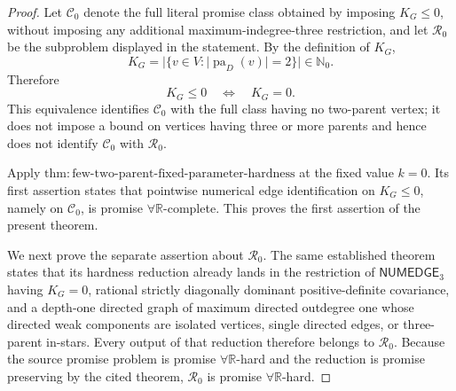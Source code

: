 \documentclass{article}
\begin{document}
\begin{proof}
Let \(\mathcal C_0\) denote the full literal promise class obtained by imposing \(K_G\leq 0\), without imposing any additional maximum-indegree-three restriction, and let \(\mathcal R_0\) be the subproblem displayed in the statement.  By the definition of \(K_G\),
\[
K_G=\bigl\lvert\{v\in V:\lvert\operatorname{pa}_D(v)\rvert=2\}\bigr\rvert\in\mathbb N_0.
\]
Therefore
\[
K_G\leq 0\quad\Longleftrightarrow\quad K_G=0.
\]
This equivalence identifies \(\mathcal C_0\) with the full class having no two-parent vertex; it does not impose a bound on vertices having three or more parents and hence does not identify \(\mathcal C_0\) with \(\mathcal R_0\).

Apply \(\mathrm{thm:few\mbox{-}two\mbox{-}parent\mbox{-}fixed\mbox{-}parameter\mbox{-}hardness}\) at the fixed value \(k=0\).  Its first assertion states that pointwise numerical edge identification on \(K_G\leq 0\), namely on \(\mathcal C_0\), is promise \(\forall\mathbb R\)-complete.  This proves the first assertion of the present theorem.

We next prove the separate assertion about \(\mathcal R_0\).  The same established theorem states that its hardness reduction already lands in the restriction of \(\mathsf{NUMEDGE}_3\) having \(K_G=0\), rational strictly diagonally dominant positive-definite covariance, and a depth-one directed graph of maximum directed outdegree one whose directed weak components are isolated vertices, single directed edges, or three-parent in-stars.  Every output of that reduction therefore belongs to \(\mathcal R_0\).  Because the source promise problem is promise \(\forall\mathbb R\)-hard and the reduction is promise preserving by the cited theorem, \(\mathcal R_0\) is promise \(\forall\mathbb R\)-hard.


\end{proof}
\end{document}
